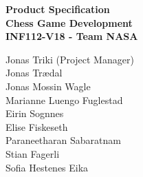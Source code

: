 \documentclass{article}
\begin{document}
	\begin{LARGE}\begin{center}
			\textbf{Product Specification\\
				Chess Game Development\\ 
				INF112-V18 - Team NASA}			
		\end{center}\end{LARGE}
	\vspace{5mm}
	
	\begin{center}
		Jonas Triki (Project Manager)\\
		Jonas Trædal\\	
		Jonas Mossin Wagle \\
		Marianne Luengo Fuglestad \\
		Eirin Sognnes\\
		Elise Fiskeseth\\
		Paraneetharan Sabaratnam\\
		Stian Fagerli\\
		Sofia Hestenes Eika\\	
	\end{center}

\vspace{10mm}
\end{document}
